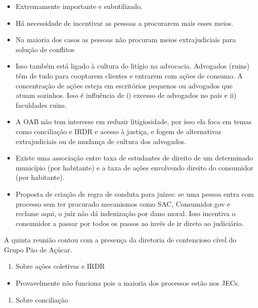 \documentclass[]{report}
\providecommand{\tightlist}{%
  \setlength{\itemsep}{0pt}\setlength{\parskip}{0pt}}
\begin{document}
\begin{itemize}
\tightlist
\item
  Extremamente importante e subutilizado.
\item
  Há necessidade de incentivar as pessoas a procurarem mais esses meios.
\item
  Na maioria dos casos as pessoas não procuram meios extrajudiciais para
  solução de conflitos
\item
  Isso também está ligado à cultura do litígio na advocacia. Advogados
  (ruins) têm de tudo para cooptarem clientes e entrarem com ações de
  consumo. A concentração de ações esteja em escritórios pequenos ou
  advogados que atuam sozinhos. Isso é influência de i) excesso de
  advogados no país e ii) faculdades ruins.
\item
  A OAB não tem interesse em reduzir litigiosidade, por isso ela foca em
  temas como conciliação e IRDR e acesso à justiça, e fogem de
  alternativas extrajudiciais ou de mudança de cultura dos advogados.
\item
  Existe uma associação entre taxa de estudantes de direito de um
  determinado município (por habitante) e a taxa de ações envolvendo
  direito do consumidor (por habitante).
\item
  Proposta de criação de regra de conduta para juízes: se uma pessoa
  entra com processo sem ter procurado mecanismos como SAC,
  Consumidor.gov e reclame aqui, o juíz não dá indenização por dano
  moral. Isso incentiva o consumidor a passar por todos os passos ao
  invés de ir direto ao judiciário.
\end{itemize}

A quinta reunião contou com a presença da diretoria de contencioso cível
do Grupo Pão de Açúcar.

\begin{enumerate}
\def\labelenumi{\arabic{enumi}.}
\tightlist
\item
  Sobre ações coletivas e IRDR
\end{enumerate}

\begin{itemize}
\tightlist
\item
  Provavelmente não funciona pois a maioria dos processos estão nos
  JECs.
\end{itemize}

\begin{enumerate}
\def\labelenumi{\arabic{enumi}.}
\tightlist
\item
  Sobre conciliação
\end{enumerate}
\end{document}
